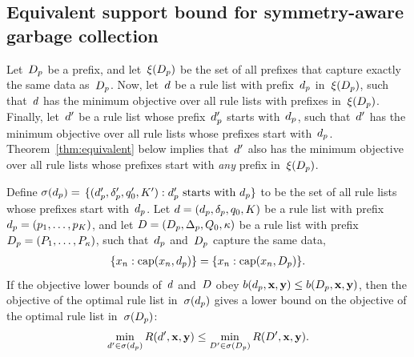 
\subsection{Equivalent support bound for symmetry-aware garbage collection}
\label{sec:equivalent}

Let~$D_p$ be a prefix, and let~$\xi(D_p)$ be the set
of all prefixes that capture exactly the same data as~$D_p$.
%
Now, let~${d}$ be a rule list with prefix~$d_p$
in~$\xi(D_p)$, such that~${d}$ has the minimum objective
over all rule lists with prefixes in~$\xi(D_p)$.
%
Finally, let~${d}'$ be a rule list whose prefix~$d_p'$
starts with~$d_p$, such that~${d}'$ has the minimum objective
over all rule lists whose prefixes start with~$d_p$.
%
Theorem~\ref{thm:equivalent} below implies that~${d}'$ also has
the minimum objective over all rule lists whose prefixes start with
\emph{any} prefix in~$\xi(D_p)$.

\begin{theorem}
\label{thm:equivalent}
Define ${\sigma(d_p) = }$
${\{(d_p', \delta_p', q_0', K') : d_p' \textnormal{ starts with } d_p \}}$
to be the set of all rule lists whose prefixes start with~$d_p$.
%
Let ${{d} = (d_p, \delta_p, q_0, K)}$
be a rule list with prefix ${d_p = (p_1, \dots, p_K)}$,
and let ${{D} = (D_p, \Delta_p, Q_0, \kappa)}$
be a rule list with prefix ${D_p = (P_1, \dots, P_{\kappa})}$,
such that~$d_p$ and~$D_p$ capture the same data, \ie
\begin{align}
\{x_n : \Cap(x_n, \Prefix)\} = \{x_n : \Cap(x_n, \PrefixB)\}.
\end{align}
%
If the objective lower bounds of~${d}$ and~${D}$
obey ${b(d_p, \mathbf{x}, \mathbf{y}) \le b(D_p, \mathbf{x}, \mathbf{y})}$,
then the objective of the optimal rule list in~$\sigma(d_p)$ gives a
lower bound on the objective of the optimal rule list in~$\sigma(D_p)$:
\begin{align}
\min_{\RL' \in \StartsWith(\Prefix)} \Obj(\RL', \x, \y)
\le \min_{\RLB' \in \StartsWith(\PrefixB)} \Obj(\RLB', \x, \y).
\label{eq:permutation}
\end{align}
\end{theorem}


